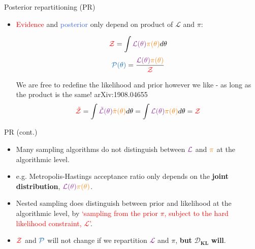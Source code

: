 \documentclass[aspectratio=169, 11pt]{beamer}
\def \bblock{\begin{beamerboxesrounded}[upper=uppercolor,lower=lowercolor,shadow=true]}
\def \eblock{\end{beamerboxesrounded}}
\begin{document}
\begin{frame}{Posterior repartitioning (PR)}\vfill
\begin{itemize}
    \item \textcolor{red}{Evidence} and \textcolor{RoyalBlue}{posterior} only depend on product of $\mathcal{L}$ and $\pi$: \vspace{-2em}
\begin{multicols}{2}
\begin{equation}
    \textcolor{red}{\mathcal{Z}} = \int \textcolor{Purple}{\mathcal{L}(\theta)} \textcolor{BurntOrange}{\pi(\theta)} d\theta
\end{equation}\break
\begin{equation}
    \textcolor{RoyalBlue}{\mathcal{P}(\theta)} = \frac{\textcolor{Purple}{\mathcal{L}(\theta)} \textcolor{BurntOrange}{\pi(\theta)}}{\textcolor{red}{\mathcal{Z}}}
\end{equation}
\end{multicols}

    \bblock{We are free to redefine the likelihood and prior however we like - as long as the product is the same! \textcolor{cfgrey}{arXiv:1908.04655}}
    \centering
    \begin{equation}
        \textcolor{red}{\tilde{\mathcal{Z}}} = \int \textcolor{Purple}{\tilde{\mathcal{L}}(\theta)} \textcolor{BurntOrange}{\tilde{\pi}(\theta)} d\theta = \int \textcolor{Purple}{\mathcal{L}(\theta)} \textcolor{BurntOrange}{\pi(\theta)} d\theta = \textcolor{red}{\mathcal{Z}}
    \end{equation}
\eblock
\end{itemize}

\end{frame}

\begin{frame}{PR (cont.)}
\begin{itemize}

\vfill
     \item Many sampling algorithms do not distinguish between $\textcolor{Purple}{\mathcal{L}}$ and $\textcolor{BurntOrange}{\pi}$ at the algorithmic level.
    \item e.g. Metropolis-Hastings acceptance ratio only depends on the \textbf{joint distribution}, $\textcolor{Purple}{\mathcal{L}(\theta)} \textcolor{BurntOrange}{\pi(\theta)}$.
   \item Nested sampling does distinguish between prior and likelihood at the algorithmic level, by \textcolor{red}{`sampling from the prior $\pi$, subject to the hard likelihood constraint, $\mathcal{L}$'}.
\vfill
\item $\textcolor{red}{\mathcal{Z}}$ and $\textcolor{RoyalBlue}{\mathcal{P}}$ will not change if we repartition \textcolor{Purple}{$\mathcal{L}$} and \textcolor{BurntOrange}{$\pi$}, \textbf{but} $\boldsymbol{\mathcal{D}}_\mathbf{\mathrm{\textbf{KL}}}$ \textbf{will}.
\end{itemize}
\end{frame}
\end{document}
